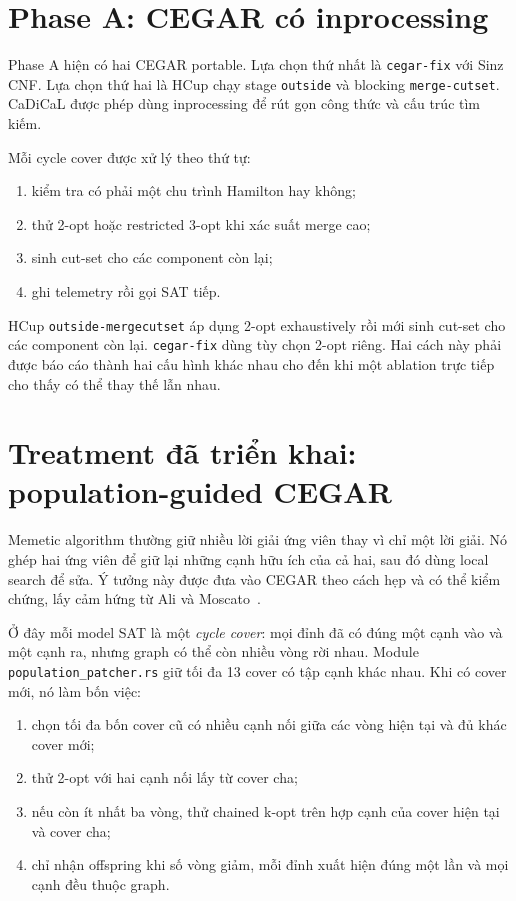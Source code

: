 \documentclass[11pt,a4paper,oneside]{scrreprt}
\newcommand{\code}[1]{\texttt{#1}}
\begin{document}
\section{Phase A: CEGAR có inprocessing}

Phase A hiện có hai CEGAR portable. Lựa chọn thứ nhất là \code{cegar-fix} với Sinz CNF. Lựa chọn thứ hai là HCup chạy stage \code{outside} và blocking \code{merge-cutset}. CaDiCaL được phép dùng inprocessing để rút gọn công thức và cấu trúc tìm kiếm.

Mỗi cycle cover được xử lý theo thứ tự:

\begin{enumerate}
  \item kiểm tra có phải một chu trình Hamilton hay không;
  \item thử 2-opt hoặc restricted 3-opt khi xác suất merge cao;
  \item sinh cut-set cho các component còn lại;
  \item ghi telemetry rồi gọi SAT tiếp.
\end{enumerate}

HCup \code{outside-mergecutset} áp dụng 2-opt exhaustively rồi mới sinh cut-set cho các component còn lại. \code{cegar-fix} dùng tùy chọn 2-opt riêng. Hai cách này phải được báo cáo thành hai cấu hình khác nhau cho đến khi một ablation trực tiếp cho thấy có thể thay thế lẫn nhau.

\section{Treatment đã triển khai: population-guided CEGAR}

Memetic algorithm thường giữ nhiều lời giải ứng viên thay vì chỉ một lời giải. Nó ghép hai ứng viên để giữ lại những cạnh hữu ích của cả hai, sau đó dùng local search để sửa. Ý tưởng này được đưa vào CEGAR theo cách hẹp và có thể kiểm chứng, lấy cảm hứng từ Ali và Moscato~\cite{ali2024}.

Ở đây mỗi model SAT là một \emph{cycle cover}: mọi đỉnh đã có đúng một cạnh vào và một cạnh ra, nhưng graph có thể còn nhiều vòng rời nhau. Module \code{population\_patcher.rs} giữ tối đa 13 cover có tập cạnh khác nhau. Khi có cover mới, nó làm bốn việc:

\begin{enumerate}
  \item chọn tối đa bốn cover cũ có nhiều cạnh nối giữa các vòng hiện tại và đủ khác cover mới;
  \item thử 2-opt với hai cạnh nối lấy từ cover cha;
  \item nếu còn ít nhất ba vòng, thử chained k-opt trên hợp cạnh của cover hiện tại và cover cha;
  \item chỉ nhận offspring khi số vòng giảm, mỗi đỉnh xuất hiện đúng một lần và mọi cạnh đều thuộc graph.
\end{enumerate}
\end{document}

